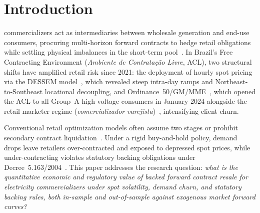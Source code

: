 \documentclass[10pt,journal]{IEEEtran}
\begin{document}
\maketitle
\IEEEdisplaynontitleabstractindextext
\IEEEpeerreviewmaketitle

\section{Introduction}

 commercializers act as intermediaries between wholesale generation and end-use consumers, procuring multi-horizon forward contracts to hedge retail obligations while settling physical imbalances in the short-term pool~\cite{Conejo2010,Hatami2009,Carrion2007,EPSR2026}. In Brazil's Free Contracting Environment (\textit{Ambiente de Contrata\c{c}\~ao Livre}, ACL), two structural shifts have amplified retail risk since 2021: the deployment of hourly spot pricing via the DESSEM model~\cite{Santos2020,CCEE2024}, which revealed steep intra-day ramps and Northeast-to-Southeast locational decoupling, and Ordinance~50/GM/MME~\cite{PortariaMME50_2022}, which opened the ACL to all Group~A high-voltage consumers in January 2024 alongside the retail marketer regime (\textit{comercializador varejista})~\cite{ANEEL_REN1011_2022,ANEEL_REN1014_2022,ANEEL_REN1081_2023}, intensifying client churn.

Conventional retail optimization models often assume two stages or prohibit secondary contract liquidation~\cite{Carrion2007,OumOren2010,Mansini2007,Kettunen2010}. Under a rigid buy-and-hold policy, demand drops leave retailers over-contracted and exposed to depressed spot prices, while under-contracting violates statutory backing obligations under Decree~5.163/2004~\cite{Decreto5163_2004}. This paper addresses the research question: \textit{what is the quantitative economic and regulatory value of backed forward contract resale for electricity commercializers under spot volatility, demand churn, and statutory backing rules, both in-sample and out-of-sample against exogenous market forward curves?}
\end{document}
